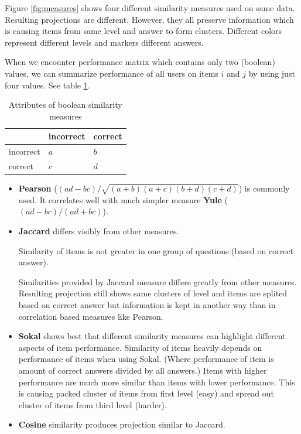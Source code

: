 \documentclass[
  digital, %
  table,   %
  nolof,     %
  nolot,     %
  nocover
]{fithesis3}
\begin{document}

Figure \ref{fig:measures} shows four different similarity measures used on same data. Resulting projections are different. However, they all preserve information which is causing items from same level and answer to form clusters. Different colors represent different levels and markers different answers.


When we encounter performance matrix which contains only two (boolean) values, we can summarize performance of all users on items $i$ and $j$ by using just four values. See table \ref{tab:boolean-attributes}.

\begin{table}
  \begin{tabular}{ | l | l | l | }
  \hline
  	 & incorrect & correct \\ \hline
  	incorrect & $a$ & $b$ \\ \hline
  	correct & $c$ & $d$ \\ \hline
  \end{tabular}
  \caption{Attributes of boolean similarity measures}
  \label{tab:boolean-attributes}
\end{table}

\begin{itemize}
\item
  \textbf{Pearson} ($(ad - bc) / \sqrt{(a+b)(a+c)(b+d)(c+d)}$) is commonly used. It correlates well with much simpler measure \textbf{Yule} ($(ad-bc)/(ad+bc)$).

\item
  \textbf{Jaccard} differs visibly from other measures.

  Similarity of items is not greater in one group of questions (based on correct answer).

  Similarities provided by Jaccard measure differe greatly from other
  measures. Resulting projection still shows same clusters of level and
  items are splited based on correct answer but information is kept in
  another way than in correlation based measures like Pearson.

\item
  \textbf{Sokal} shows best that different similarity measures can highlight different aspects of item performance. Similarity of items  heavily depends on performance of items when using Sokal. (Where performance of item is amount of correct answers divided by all answers.) Items with higher performance are much more similar than items with lower performance. This is causing packed cluster of items from first level (easy) and spread out cluster of items from third level (harder).

\item
  \textbf{Cosine} similarity produces projection similar to Jaccard.
\end{itemize}
\end{document}
